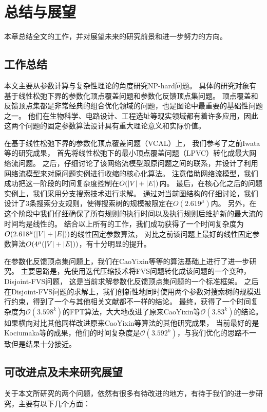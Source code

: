 ﻿\chapter{总结与展望}

本章总结全文的工作，并对展望未来的研究前景和进一步努力的方向。

\section{工作总结}
本文主要从参数计算与复杂性理论的角度研究NP-hard问题。
具体的研究对象有基于线性松弛下界的参数化顶点覆盖问题和参数化反馈顶点集问题。
顶点覆盖和反馈顶点集都是非常经典的组合优化领域的问题，也是图论中最重要的基础性问题之一。
他们在生物科学、电路设计、工程选址等现实领域都有着许多应用，因此这两个问题的固定参数算法设计具有重大理论意义和实际价值。

在基于线性松弛下界的参数化顶点覆盖问题（VCAL）上，
我们参考了之前Iwata等的研究成果，
首先将线性松弛下的最小顶点覆盖问题（LPVC）转化成最大网络流问题。
之后，仔细讨论了该网络流模型跟原问题之间的联系，并设计了利用网络流模型来对原问题实例进行收缩的核心化算法。
注意借助网络流模型，我们成功把这一阶段的时间复杂度控制在$O(\left\vert V \right\vert + \left\vert E \right\vert)$内。
最后，在核心化之后的问题实例上，我们采用分支搜索技术进行求解。
通过对当前图结构的仔细讨论，我们设计了3条搜索分支规则，使得搜索树的规模被限定在$O(2.619^\mu)$内。
另外，在这个阶段中我们仔细确保了所有规则的执行时间以及执行规则后维护新的最大流的时间均是线性的。
结合以上所有的工作，我们成功获得了一个时间复杂度为$O(2.618^\mu(\left\vert V \right\vert + \left\vert E \right\vert))$的线性固定参数算法，
对比之前该问题上最好的线性固定参数算法$O(4^\mu(\left\vert V \right\vert + \left\vert E \right\vert))$，有十分明显的提升。


在参数化反馈顶点集问题上，我们在CaoYixin等等的算法基础上进行了进一步研究。
主要思路是，先使用迭代压缩技术将FVS问题转化成该问题的一个变种，Disjoint-FVS问题，
这是当前求解参数化反馈顶点集问题的一个标准框架。
之后在Disjoint-FVS问题的求解上，我们创新性地同时使用两个参数对搜索树的规模进行约束，得到了一个与其他相关文献都不一样的结论。
最终，获得了一个时间复杂度为$\mathcal{O}(3.598^k)$的FPT算法，大大地改进了原来CaoYixin等$\mathcal{O}(3.83^k)$的结论。
如果横向对比其他同样改进原来CaoYixin等算法的其他研究成果，
当前最好的是Kociumaka等的成果，他们的时间复杂度是$\mathcal{O}(3.592^k)$，与我们优化的思路不一致但是结果十分接近。


\section{可改进点及未来研究展望}
关于本文所研究的两个问题，依然有很多有待改进的地方，有待于我们的进一步研究，主要有以下几个方面： 

